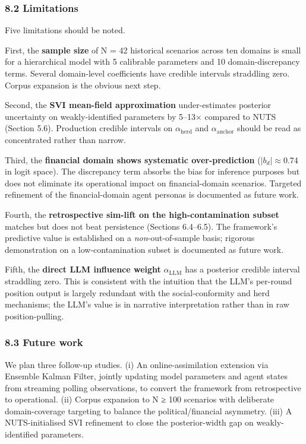 \documentclass[
]{article}
\begin{document}
\subsubsection{8.2 Limitations}\label{limitations}

Five limitations should be noted.

First, the \textbf{sample size} of N = 42 historical scenarios across
ten domains is small for a hierarchical model with 5 calibrable
parameters and 10 domain-discrepancy terms. Several domain-level
coefficients have credible intervals straddling zero. Corpus expansion
is the obvious next step.

Second, the \textbf{SVI mean-field approximation} under-estimates
posterior uncertainty on weakly-identified parameters by 5--13× compared
to NUTS (Section 5.6). Production credible intervals on
\(\alpha_{\text{herd}}\) and \(\alpha_{\text{anchor}}\) should be read
as concentrated rather than narrow.

Third, the \textbf{financial domain shows systematic over-prediction}
(\(|b_d| \approx 0.74\) in logit space). The discrepancy term absorbs
the bias for inference purposes but does not eliminate its operational
impact on financial-domain scenarios. Targeted refinement of the
financial-domain agent personas is documented as future work.

Fourth, the \textbf{retrospective sim-lift on the high-contamination
subset} matches but does not beat persistence (Sections 6.4--6.5). The
framework's predictive value is established on a
\emph{non}-out-of-sample basis; rigorous demonstration on a
low-contamination subset is documented as future work.

Fifth, the \textbf{direct LLM influence weight} \(\alpha_{\text{LLM}}\)
has a posterior credible interval straddling zero. This is consistent
with the intuition that the LLM's per-round position output is largely
redundant with the social-conformity and herd mechanisms; the LLM's
value is in narrative interpretation rather than in raw
position-pulling.

\subsubsection{8.3 Future work}\label{future-work}

We plan three follow-up studies. (i) An online-assimilation extension
via Ensemble Kalman Filter, jointly updating model parameters and agent
states from streaming polling observations, to convert the framework
from retrospective to operational. (ii) Corpus expansion to N ≥ 100
scenarios with deliberate domain-coverage targeting to balance the
political/financial asymmetry. (iii) A NUTS-initialised SVI refinement
to close the posterior-width gap on weakly-identified parameters.
\end{document}

